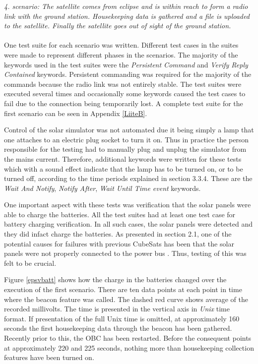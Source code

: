 \documentclass[english,12pt,a4paper,pdftex,elec,utf8]{aaltothesis}
\begin{document}
\textit{4. scenario: The satellite comes from eclipse and is within reach to form a radio link with the ground station. Housekeeping data is gathered and a file is uploaded to the satellite. Finally the satellite goes out of sight of the ground station.}\\
\\
One test suite for each scenario was written. Different test cases in the suites were made to represent different phases in the scenarios. The majority of the keywords used in the test suites were the \textit{Persistent Command} and \textit{Verify Reply Contained} keywords. Persistent commanding was required for the majority of the commands because the radio link was not entirely stable. The test suites were executed several times and occasionally some keywords caused the test cases to fail due to the connection being temporarily lost. A complete test suite for the first scenario can be seen in Appendix \ref{LiiteB}.\par
Control of the solar simulator was not automated due it being simply a lamp that one attaches to an electric plug socket to turn it on. Thus in practice the person responsible for the testing had to manually plug and unplug the simulator from the mains current. Therefore, additional keywords were written for these tests which with a sound effect indicate that the lamp has to be turned on, or to be turned off, according to the time periods explained in section 3.3.4. These are the \textit{Wait And Notify}, \textit{Notify After}, \textit{Wait Until Time event} keywords.\par
One important aspect with these tests was verification that the solar panels were able to charge the batteries. All the test suites had at least one test case for battery charging verification. In all such cases, the solar panels were detected and they did infact charge the batteries. As presented in section 2.1, one of the potential causes for failures with previous CubeSats has been that the solar panels were not properly connected to the power bus \cite{Swart1}. Thus, testing of this was felt to be crucial.\par 
Figure \ref{epsvbatt} shows how the charge in the batteries changed over the execution of the first scenario. There are ten data points at each point in time where the beacon feature was called. The dashed red curve shows average of the recorded millivolts. The time is presented in the vertical axis in \textit{Unix} time format. If presentation of the full Unix time is omitted, at approximately 160 seconds the first housekeeping data through the beacon has been gathered. Recently prior to this, the OBC has been restarted. Before the consequent points at approximately 220 and 225 seconds, nothing more than housekeeping collection features have been turned on.\par
\end{document}
